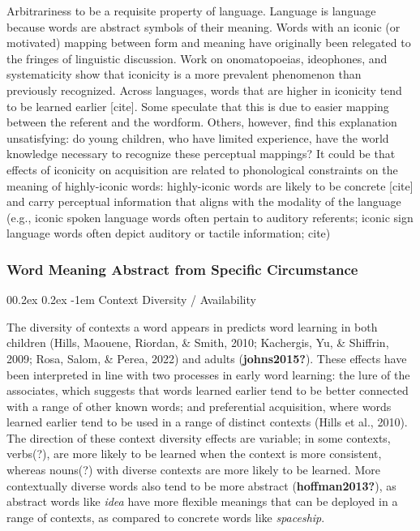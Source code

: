 \documentclass[
  man,floatsintext]{apa6}
\makeatletter
\let\oldparagraph\paragraph
\renewcommand{\paragraph}[1]{\oldparagraph{#1}\mbox{}}
\renewcommand{\paragraph}{\@startsection{paragraph}{4}{\parindent}%
  {0\baselineskip \@plus 0.2ex \@minus 0.2ex}%
  {-1em}%
  {\normalfont\normalsize\bfseries\itshape\typesectitle}}
\makeatother
\begin{document}
Arbitrariness to be a requisite property of language. Language is language because words are abstract symbols of their meaning. Words with an iconic (or motivated) mapping between form and meaning have originally been relegated to the fringes of linguistic discussion. Work on onomatopoeias, ideophones, and systematicity show that iconicity is a more prevalent phenomenon than previously recognized. Across languages, words that are higher in iconicity tend to be learned earlier {[}cite{]}. Some speculate that this is due to easier mapping between the referent and the wordform. Others, however, find this explanation unsatisfying: do young children, who have limited experience, have the world knowledge necessary to recognize these perceptual mappings? It could be that effects of iconicity on acquisition are related to phonological constraints on the meaning of highly-iconic words: highly-iconic words are likely to be concrete {[}cite{]} and carry perceptual information that aligns with the modality of the language (e.g., iconic spoken language words often pertain to auditory referents; iconic sign language words often depict auditory or tactile information; cite)

\hypertarget{word-meaning-abstract-from-specific-circumstance}{%
\subsubsection{Word Meaning Abstract from Specific Circumstance}\label{word-meaning-abstract-from-specific-circumstance}}

\hypertarget{context-diversity-availability}{%
\paragraph{Context Diversity / Availability}\label{context-diversity-availability}}

The diversity of contexts a word appears in predicts word learning in both children (Hills, Maouene, Riordan, \& Smith, 2010; Kachergis, Yu, \& Shiffrin, 2009; Rosa, Salom, \& Perea, 2022) and adults (\textbf{johns2015?}). These effects have been interpreted in line with two processes in early word learning: the lure of the associates, which suggests that words learned earlier tend to be better connected with a range of other known words; and preferential acquisition, where words learned earlier tend to be used in a range of distinct contexts (Hills et al., 2010). The direction of these context diversity effects are variable; in some contexts, verbs(?), are more likely to be learned when the context is more consistent, whereas nouns(?) with diverse contexts are more likely to be learned. More contextually diverse words also tend to be more abstract (\textbf{hoffman2013?}), as abstract words like \emph{idea} have more flexible meanings that can be deployed in a range of contexts, as compared to concrete words like \emph{spaceship}.
\end{document}
